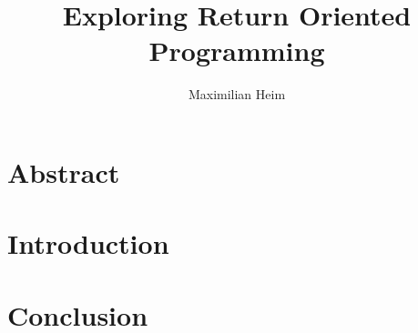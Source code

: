 \documentclass[10pt,a4paper,twocolumn]{article}
\author{Maximilian Heim}
\title{Exploring Return Oriented Programming}
\begin{document}
\maketitle
\section{Abstract}
\section{Introduction}
\section{Conclusion}

\end{document}

